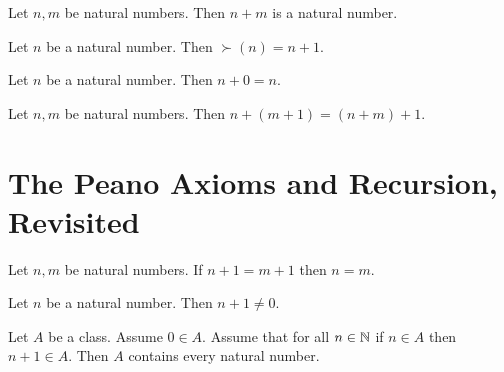 \documentclass[10pt]{article}
\begin{document}
  \begin{forthel}
    \begin{lemma}
      Let $n, m$ be natural numbers.
      Then $n + m$ is a natural number.
    \end{lemma}
  \end{forthel}

  \begin{forthel}
    \begin{lemma}
      Let $n$ be a natural number.
      Then $\succ(n) = n + 1$.
    \end{lemma}
  \end{forthel}

  \begin{forthel}
    \begin{lemma}
      Let $n$ be a natural number.
      Then $n + 0 = n$.
    \end{lemma}
  \end{forthel}

  \begin{forthel}
    \begin{lemma}
      Let $n, m$ be natural numbers.
      Then $n + (m + 1) = (n + m) + 1$.
    \end{lemma}
  \end{forthel}


  \section{The Peano Axioms and Recursion, Revisited}

  \begin{forthel}
    \begin{proposition}
      Let $n, m$ be natural numbers.
      If $n + 1 = m + 1$ then $n = m$.
    \end{proposition}
  \end{forthel}

  \begin{forthel}
    \begin{proposition}
      Let $n$ be a natural number.
      Then $n + 1 \neq 0$.
    \end{proposition}
  \end{forthel}

  \begin{forthel}
    \begin{proposition}[Induction]
      Let $A$ be a class.
      Assume $0 \in A$.
      Assume that for all $n \in \mathbb{N}$ if $n \in A$ then $n + 1 \in A$.
      Then $A$ contains every natural number.
    \end{proposition}
  \end{forthel}
\end{document}
